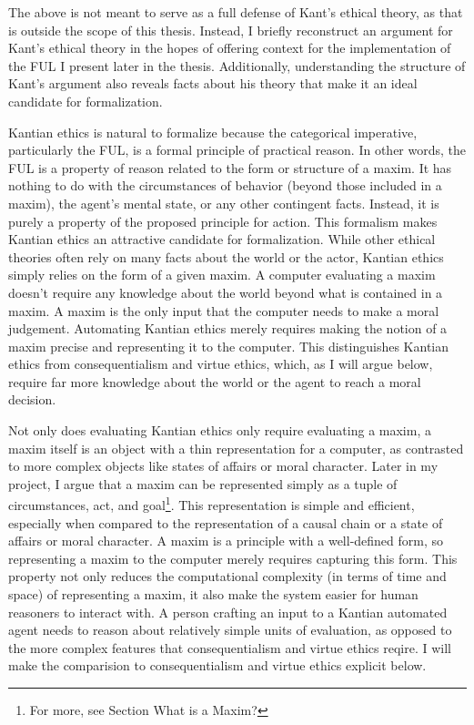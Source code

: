 \begin{isabellebody}
\begin{isamarkuptext}
The above is not meant to serve as a full defense of Kant's ethical theory, as that is outside the scope
of this thesis. Instead, I briefly reconstruct an argument for Kant's ethical theory in the hopes 
of offering context for the implementation of the FUL I present later in the thesis. Additionally, understanding 
the structure of Kant's argument also reveals facts about his theory that make it an ideal candidate 
for formalization.%
\end{isamarkuptext}\isamarkuptrue%
%
\isadelimdocument
%
\endisadelimdocument
%
\isatagdocument
%
\isamarkuptrue%
%
\endisatagdocument
{\isafolddocument}%
%
\isadelimdocument
%
\endisadelimdocument
%
\begin{isamarkuptext}%
Kantian ethics is natural to formalize because the categorical imperative, particularly the FUL, 
is a formal principle of practical reason. In other words, the FUL is a property of reason related 
to the form or structure of a maxim. It has nothing to do with the circumstances of behavior 
(beyond those included in a maxim), the agent's mental state, or any other contingent facts. Instead, 
it is purely a property of the proposed principle for action. This formalism makes Kantian ethics an 
attractive candidate for formalization. While other ethical theories often rely on many facts about 
the world or the actor, Kantian ethics simply relies on the form of a given maxim. A computer evaluating 
a maxim doesn't require any knowledge about the world beyond what is contained in a maxim. A maxim 
is the only input that the computer needs to make a moral judgement. Automating 
Kantian ethics merely requires making the notion of a maxim precise and representing it to the computer. 
This distinguishes Kantian ethics from consequentialism and virtue ethics, which, as I will argue below, 
require far more knowledge about the world or the agent to reach a moral decision.

Not only does evaluating Kantian ethics only require evaluating a maxim, a maxim itself is an object
with a thin representation for a computer, as contrasted to more complex objects like states of 
affairs or moral character. Later in my project, I argue that a maxim can be represented simply as 
a tuple of circumstances, act, and goal\footnote{For more, see Section What is a Maxim?}. This representation
is simple and efficient, especially when compared to the representation of a causal chain or a state of 
affairs or moral character. A maxim is a principle with a well-defined form, so representing a maxim
to the computer merely requires capturing this form. This property not only reduces the computational complexity
(in terms of time and space) of representing a maxim, it also make the system easier for human reasoners
to interact with. A person crafting an input to a Kantian automated agent needs to reason about relatively
simple units of evaluation, as opposed to the more complex features that consequentialism and virtue
ethics reqire. I will make the comparision to consequentialism and virtue ethics explicit below.


\end{isamarkuptext}
\end{isabellebody}
